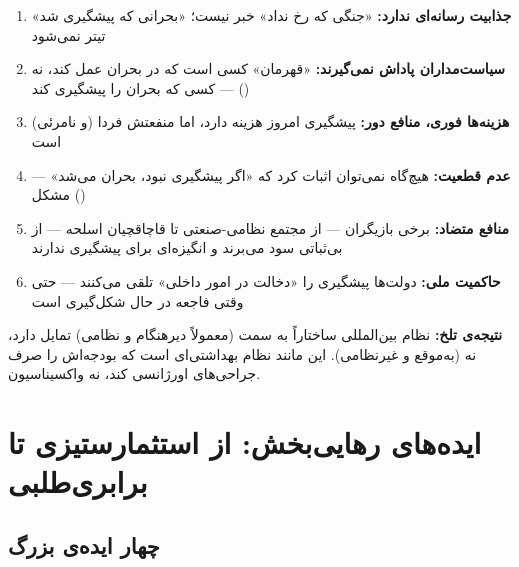 \begin{tcolorbox}[failbox, title={دلایل ساختاری غفلت از پیشگیری}]
\begin{enumerate}
\item \textbf{جذابیت رسانه‌ای ندارد:} «جنگی که رخ نداد» خبر نیست؛
  «بحرانی که پیشگیری شد» تیتر نمی‌شود
\item \textbf{سیاست‌مداران پاداش نمی‌گیرند:} «قهرمان» کسی است که در بحران
  عمل کند، نه کسی که بحران را پیشگیری کند — 
  ()
\item \textbf{هزینه‌ها فوری، منافع دور:} پیشگیری امروز هزینه دارد، اما
  منفعتش فردا (و نامرئی) است
\item \textbf{عدم قطعیت:} هیچ‌گاه نمی‌توان اثبات کرد که «اگر پیشگیری
  نبود، بحران می‌شد» — مشکل  ()
\item \textbf{منافع متضاد:} برخی بازیگران — از مجتمع نظامی-صنعتی تا
  قاچاقچیان اسلحه — از بی‌ثباتی سود می‌برند و انگیزه‌ای برای پیشگیری
  ندارند
\item \textbf{حاکمیت ملی:} دولت‌ها پیشگیری را «دخالت در امور داخلی»
  تلقی می‌کنند — حتی وقتی فاجعه در حال شکل‌گیری است
\end{enumerate}

\textbf{نتیجه‌ی تلخ:} نظام بین‌المللی ساختاراً به سمت 
(معمولاً دیرهنگام و نظامی) تمایل دارد، نه  (به‌موقع و
غیرنظامی). این مانند نظام بهداشتی‌ای است که بودجه‌اش را صرف جراحی‌های
اورژانسی کند، نه واکسیناسیون.
\end{tcolorbox}


\section{ایده‌های رهایی‌بخش: از استثمارستیزی تا برابری‌طلبی}
\label{sec:ch17-liberating-ideas}

\subsection{چهار ایده‌ی بزرگ}

